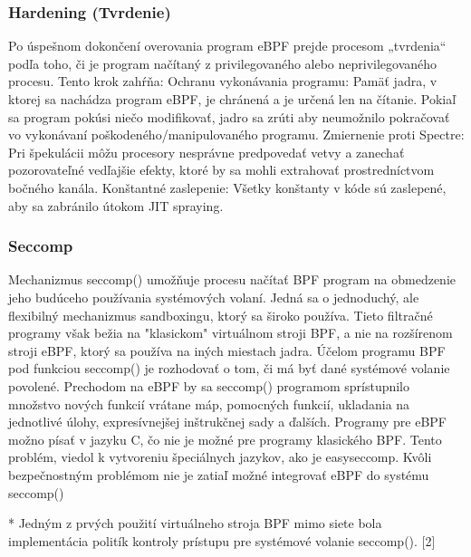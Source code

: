 \subsubsection*{Hardening (Tvrdenie)}
Po úspešnom dokončení overovania program eBPF prejde procesom „tvrdenia“ podľa toho, či je program načítaný z privilegovaného alebo neprivilegovaného procesu. Tento krok zahŕňa:
Ochranu vykonávania programu: 
Pamäť jadra, v ktorej sa nachádza program eBPF, je chránená a je určená len na čítanie. Pokiaľ sa program pokúsi niečo modifikovať, jadro sa zrúti aby neumožnilo pokračovať vo vykonávaní poškodeného/manipulovaného programu.
Zmiernenie proti Spectre: 
Pri špekulácii môžu procesory nesprávne predpovedať vetvy a zanechať pozorovateľné vedľajšie efekty, ktoré by sa mohli extrahovať prostredníctvom bočného kanála.
Konštantné zaslepenie: 
Všetky konštanty v kóde sú zaslepené, aby sa zabránilo útokom JIT spraying.

\subsubsection{Seccomp}
Mechanizmus seccomp() umožňuje procesu načítať BPF program na obmedzenie jeho budúceho používania systémových volaní.
Jedná sa o jednoduchý, ale flexibilný mechanizmus sandboxingu, ktorý sa široko používa. 
Tieto filtračné programy však bežia na "klasickom" virtuálnom stroji BPF, a nie na rozšírenom stroji eBPF, ktorý sa používa na iných miestach jadra. 
Účelom programu BPF pod funkciou seccomp() je rozhodovať o tom, či má byť dané systémové volanie povolené.
Prechodom na eBPF by sa seccomp() programom sprístupnilo množstvo nových funkcií vrátane máp, pomocných funkcií, ukladania na jednotlivé úlohy, expresívnejšej inštrukčnej sady a ďalších. 
Programy pre eBPF možno písať v jazyku C, čo nie je možné pre programy klasického BPF. 
Tento problém, viedol k vytvoreniu špeciálnych jazykov, ako je easyseccomp. 
Kvôli bezpečnostným problémom nie je zatiaľ možné integrovať eBPF do systému seccomp()

* Jedným z prvých použití virtuálneho stroja BPF mimo siete bola implementácia politík kontroly prístupu pre systémové volanie seccomp(). [2]

